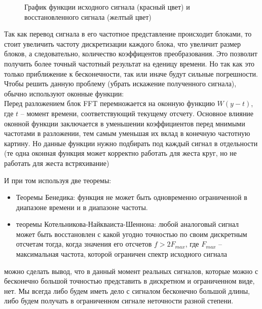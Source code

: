 \begin{figure}[H]
    \caption{График функции исходного сигнала (красный цвет) и восстановленного сигнала (желтый цвет)}
\end{figure}


Так как перевод сигнала в его частотное представление происходит блоками, то стоит увеличить частоту дискретизации каждого блока, что увеличит размер блоков, а следовательно, количество коэффицентов преобразования. Это позволит получить более точный частотный результат на еденицу времени. Но так как это только приближение к бесконечности, так или иначе будут сильные погрешности. \\

Чтобы решить данную проблему (убрать искажение полученного сигнала), обычно используют оконные функции: \\
Перед разложением блок FFT перемножается на оконную функцию $W(y - t)$, где $t$ -- момент времени, соответствующий текущему отсчету. Основное влияние оконной функции заключается в уменьшении коэффициентов перед мнимыми частотами в разложении, тем самым уменьшая их вклад в конечную частотную картину. Но данные функции нужно подбирать под каждый сигнал в отдельности (те одна оконная функция может корректно работать для жеста круг, но не работать для жеста встряхивание)

И при том используя две теоремы:
\begin{itemize}
    \item Теоремы Бенедика: функция не может быть одновременно ограниченной в диапазоне времени и в диапазоне частоты.
    \item теоремы Котельникова-Найкваиста-Шеннона: любой аналоговый сигнал может быть восстановлен с какой угодно точностью по своим дискретным отсчетам тогда, когда значения его отсчетов $f > 2 F_{max}$, где $F_{max}$ -- максимальная частота, которой ограничен спектр исходного сигнала
\end{itemize}
можно сделать вывод, что в данный момент реальных сигналов, которые можно с бесконечно большой точностью представить в дискретном и ограниченном виде, нет. Мы всегда либо будем иметь дело с сигналом бесконечно большой длины, либо будем получать в ограниченном сигнале неточности разной степени.

